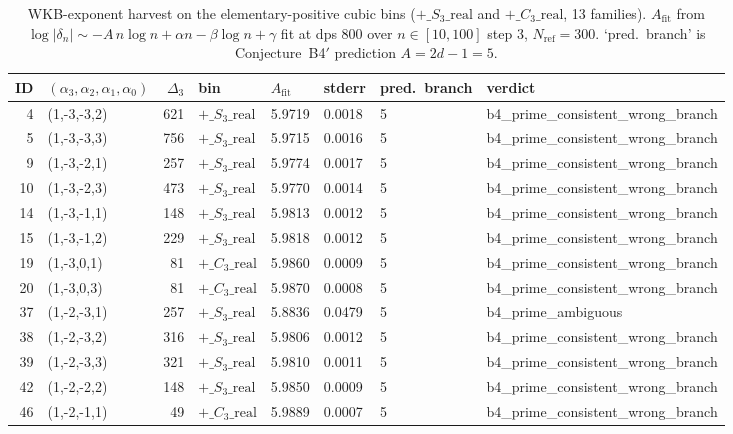 \begin{table}[ht]
\centering
\small
\caption{WKB-exponent harvest on the elementary-positive cubic bins ($+\_S_3\_\mathrm{real}$ and $+\_C_3\_\mathrm{real}$, 13 families). $A_{\mathrm{fit}}$ from $\log|\delta_n| \sim -A\, n\log n + \alpha n - \beta\log n + \gamma$ fit at dps 800 over $n\in[10,100]$ step 3, $N_{\mathrm{ref}} = 300$. `pred.\ branch' is Conjecture~B4$'$ prediction $A = 2d - 1 = 5$.}
\label{tab:pcf2-sessionC1-wkb}
\begin{tabular}{rlrlllll}
\hline
\textbf{ID} & \textbf{$(\alpha_3,\alpha_2,\alpha_1,\alpha_0)$} & \textbf{$\Delta_3$} & \textbf{bin} & \textbf{$A_{\mathrm{fit}}$} & \textbf{stderr} & \textbf{pred.\ branch} & \textbf{verdict} \\ \hline
4 & (1,-3,-3,2) & 621 & $+\_S_3\_\mathrm{real}$ & 5.9719 & 0.0018 & 5 & b4\_prime\_consistent\_wrong\_branch \\
5 & (1,-3,-3,3) & 756 & $+\_S_3\_\mathrm{real}$ & 5.9715 & 0.0016 & 5 & b4\_prime\_consistent\_wrong\_branch \\
9 & (1,-3,-2,1) & 257 & $+\_S_3\_\mathrm{real}$ & 5.9774 & 0.0017 & 5 & b4\_prime\_consistent\_wrong\_branch \\
10 & (1,-3,-2,3) & 473 & $+\_S_3\_\mathrm{real}$ & 5.9770 & 0.0014 & 5 & b4\_prime\_consistent\_wrong\_branch \\
14 & (1,-3,-1,1) & 148 & $+\_S_3\_\mathrm{real}$ & 5.9813 & 0.0012 & 5 & b4\_prime\_consistent\_wrong\_branch \\
15 & (1,-3,-1,2) & 229 & $+\_S_3\_\mathrm{real}$ & 5.9818 & 0.0012 & 5 & b4\_prime\_consistent\_wrong\_branch \\
19 & (1,-3,0,1) & 81 & $+\_C_3\_\mathrm{real}$ & 5.9860 & 0.0009 & 5 & b4\_prime\_consistent\_wrong\_branch \\
20 & (1,-3,0,3) & 81 & $+\_C_3\_\mathrm{real}$ & 5.9870 & 0.0008 & 5 & b4\_prime\_consistent\_wrong\_branch \\
37 & (1,-2,-3,1) & 257 & $+\_S_3\_\mathrm{real}$ & 5.8836 & 0.0479 & 5 & b4\_prime\_ambiguous \\
38 & (1,-2,-3,2) & 316 & $+\_S_3\_\mathrm{real}$ & 5.9806 & 0.0012 & 5 & b4\_prime\_consistent\_wrong\_branch \\
39 & (1,-2,-3,3) & 321 & $+\_S_3\_\mathrm{real}$ & 5.9810 & 0.0011 & 5 & b4\_prime\_consistent\_wrong\_branch \\
42 & (1,-2,-2,2) & 148 & $+\_S_3\_\mathrm{real}$ & 5.9850 & 0.0009 & 5 & b4\_prime\_consistent\_wrong\_branch \\
46 & (1,-2,-1,1) & 49 & $+\_C_3\_\mathrm{real}$ & 5.9889 & 0.0007 & 5 & b4\_prime\_consistent\_wrong\_branch \\
\hline
\end{tabular}
\end{table}
